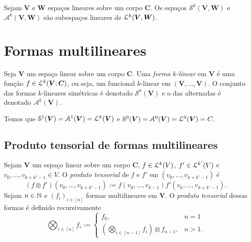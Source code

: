 \begin{proposition}
Sejam $\bm V$ e $\bm W$ espaços lineares sobre um corpo $\bm C$. Os espaços $\mathcal S^k(\bm V,\bm W)$ e $\mathcal A^k(\bm V,\bm W)$ são subespaços lineares de $\mathcal{L}^k(\bm V,\bm W)$.
\end{proposition}

\section{Formas multilineares}

\begin{definition}
Seja $\bm V$ um espaço linear sobre um corpo $\bm C$. Uma \emph{forma $k$-linear} em $\bm V$ é uma função $f \in \mathcal{L}^k(\bm V;\bm C)$, ou seja, um funcional $k$-linear em $(\bm V,\ldots,\bm V)$. O conjunto das formas $k$-lineares simétricas é denotado $\mathcal{S}^k(\bm V)$ e o das alternadas é denotado $\mathcal{A}^k(\bm V)$.
\end{definition}

Temos que $\mathcal{S}^1(\bm V) = \mathcal{A}^1(\bm V) = \mathcal{L}^k(\bm V)$ e $\mathcal{S}^0(\bm V) = \mathcal{A}^0(\bm V) = \mathcal{L}^0(\bm V) = C$.

\subsection{Produto tensorial de formas multilineares}

\begin{definition}
Sejam $\bm V$ um espaço linear sobre um corpo $\bm C$, $f \in \mathcal{L}^k(V)$, $f' \in \mathcal{L}^{k'}(V)$ e $v_0,\ldots,v_{k+k'-1} \in V$. O \emph{produto tensorial} de $f$ e $f'$ em $(v_0,\ldots,v_{k+k'-1})$ é
	\begin{equation*}
	(f \otimes f')(v_0,\ldots,v_{k+k'-1}) := f(v_0,\ldots,v_{k-1})f'(v_k,\ldots,v_{k+k'-1}).
	\end{equation*}
Sejam $n \in \mathbb{N}$ e $(f_i)_{i \in [n]}$ formas multilineares em $\bm V$. O \emph{produto tensorial} dessas formas é definido recursivamente
	\begin{equation*}
	\bigotimes_{i \in [n]} f_i := \begin{cases}
		f_0,& n=1 \\
		\left(\displaystyle\bigotimes_{i \in [n-1]} f_i \right) \otimes f_{n-1} ,& n>1.
	\end{cases}
	\end{equation*}
\end{definition}

